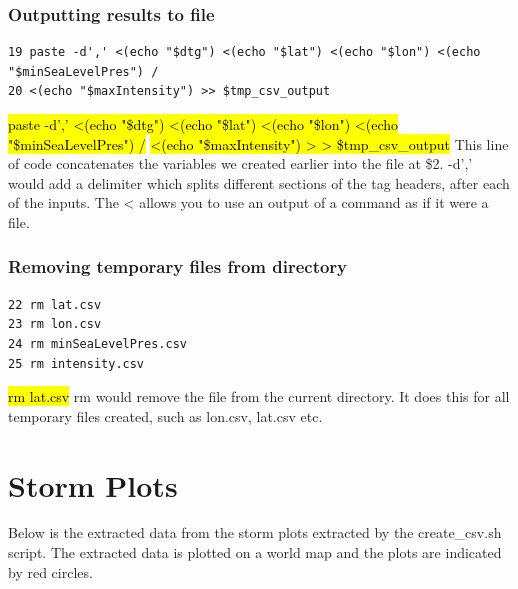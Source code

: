 \documentclass[]{article}
\begin{document}
\subsubsection{Outputting results to file}
\begin{tcolorbox}[colback=white, colframe=black, boxrule=1pt,
    title=Outputting results to file, width=6.7in, fonttitle=\bfseries, listing only, listing options={language=sh, basicstyle=\ttfamily}]
\begin{verbatim}
19 paste -d',' <(echo "$dtg") <(echo "$lat") <(echo "$lon") <(echo "$minSeaLevelPres") /
20 <(echo "$maxIntensity") >> $tmp_csv_output
\end{verbatim}
\hl{paste -d',' <(echo "\$dtg") <(echo "\$lat") <(echo "\$lon") <(echo "\$minSeaLevelPres") /}\newline
\hl{<(echo "\$maxIntensity") > > \$tmp\_csv\_output}\newline
This line of code concatenates the variables we created earlier into the file at \$2.\newline
-d',' would add a delimiter which splits different sections of the tag headers, after each of\newline
the inputs. The < allows you to use an output of a command as if it were a file.\newline
\end{tcolorbox}

\subsubsection{Removing temporary files from directory}
\begin{tcolorbox}[colback=white, colframe=black, boxrule=1pt, 
    title=Removing temporary files from directory, width=6.7in, fonttitle=\bfseries, listing only, listing options={language=sh, basicstyle=\ttfamily}]
\begin{verbatim}
22 rm lat.csv
23 rm lon.csv
24 rm minSeaLevelPres.csv
25 rm intensity.csv
\end{verbatim}
\hl{rm lat.csv}\newline
rm would remove the file from the current directory. It does this for all temporary files created,\newline
such as lon.csv, lat.csv etc.
\end{tcolorbox}
\clearpage



\section{Storm Plots}
Below is the extracted data from the storm plots extracted by the create\_csv.sh
script. The extracted data is plotted on a world map and the plots are indicated by
red circles. 
\end{document}
